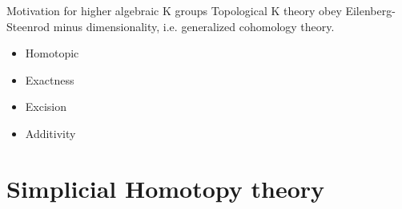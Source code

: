 \documentclass[10pt]{beamer}
\begin{document}
\begin{frame}{Motivation for higher algebraic K groups}
	Topological K theory obey Eilenberg-Steenrod minus dimensionality, i.e. generalized cohomology theory.
	\begin{itemize}
		\item Homotopic
		\item Exactness
		\item Excision
		\item Additivity
	\end{itemize}
	
\end{frame}

\section{Simplicial Homotopy theory}
\end{document}
